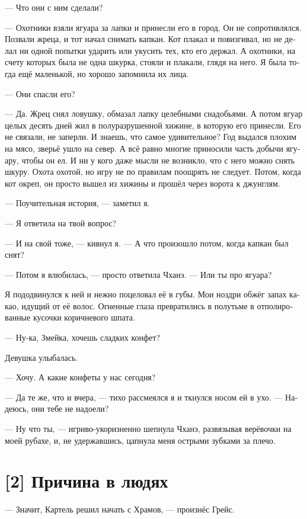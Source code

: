 \documentclass[a4paper,12pt,fleqn]{book}\usepackage{cooltooltips}\usepackage{polyglossia}\setdefaultlanguage[babelshorthands=true]{russian}\setotherlanguage{english}\defaultfontfeatures{Ligatures=TeX,Mapping=tex-text} \usepackage{xcolor}\definecolor{lightgray}{HTML}{bbbbbb}\color{lightgray}\newcommand{\ml}[3]{\textenglish{\textcolor{black}{#3}}}
\begin{document}
{--- Что они с ним сделали?

--- Охотники взяли ягуара за лапки и принесли его в город.
Он не сопротивлялся.
Позвали жреца, и тот начал снимать капкан.
Кот плакал и повизгивал, но не делал ни одной попытки ударить или укусить тех, кто его держал.
А охотники, на счету которых была не одна шкурка, стояли и плакали, глядя на него.
Я была тогда ещё маленькой, но хорошо запомнила их лица.

--- Они спасли его?

--- Да.
Жрец снял ловушку, обмазал лапку целебными снадобьями.
А потом ягуар целых десять дней жил в полуразрушенной хижине, в которую его принесли.
Его не связали, не заперли.
И знаешь, что самое удивительное?
Год выдался плохим на мясо, зверьё ушло на север.
А всё равно многие приносили часть добычи ягуару, чтобы он ел.
И ни у кого даже мысли не возникло, что с него можно снять шкуру.
Охота охотой, но игру не по правилам поощрять не следует.
Потом, когда кот окреп, он просто вышел из хижины и прошёл через ворота к джунглям.

--- Поучительная история, --- заметил я.

--- Я ответила на твой вопрос?

--- И на свой тоже, --- кивнул я.
--- А что произошло потом, когда капкан был снят?

--- Потом я влюбилась, --- просто ответила Чханэ.
--- Или ты про ягуара?

Я пододвинулся к ней и нежно поцеловал её в губы.
Мои ноздри обжёг запах какао, идущий от её волос.
Огненные глаза превратились в полутьме в отполированные кусочки коричневого шпата.

--- Ну-ка, Змейка, хочешь сладких конфет?

Девушка улыбалась.

--- Хочу.
А какие конфеты у нас сегодня?

--- Да те же, что и вчера, --- тихо рассмеялся я и ткнулся носом ей в ухо.
--- Надеюсь, они тебе не надоели?

--- Ну что ты, --- игриво-укоризненно шепнула Чханэ, развязывая верёвочки на моей рубахе, и, не удержавшись, цапнула меня острыми зубками за плечо.

\section{[2] Причина в людях}

--- Значит, Картель решил начать с Храмов, --- произнёс Грейс.

}
\end{document}
